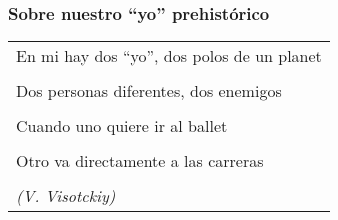 \protect\hypertarget{M7}{}{}

\hypertarget{sobre-nuestro-yo-prehistuxf3rico}{\subsubsection{\texorpdfstring{Sobre
nuestro ``yo''
prehistórico}{Sobre nuestro yo prehistórico}}\label{sobre-nuestro-yo-prehistuxf3rico}}

\begin{longtable}[]{@{}l@{}}
\toprule
En mi hay dos ``yo'', dos polos de un planet\tabularnewline
\tabularnewline
Dos personas diferentes, dos enemigos\tabularnewline
\tabularnewline
Cuando uno quiere ir al ballet\tabularnewline
\tabularnewline
Otro va directamente a las carreras\tabularnewline
\tabularnewline
\emph{(V. Visotckiy)}\tabularnewline
\bottomrule
\end{longtable}

